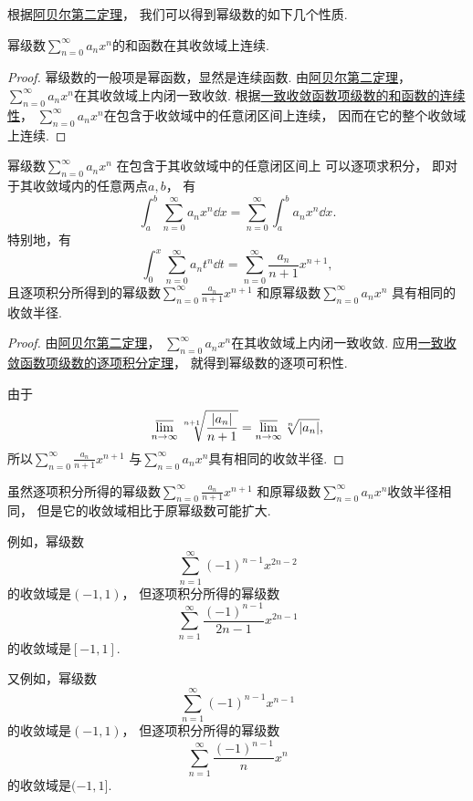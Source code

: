 根据\hyperref[theorem:无穷级数.阿贝尔定理2]{阿贝尔第二定理}，
我们可以得到幂级数的如下几个性质.

\begin{property}\label{theorem:无穷级数.幂级数的和函数的性质1}
幂级数\(\sum_{n=0}^\infty a_n x^n\)的和函数在其收敛域上连续.
\begin{proof}
幂级数的一般项是幂函数，显然是连续函数.
由\hyperref[theorem:无穷级数.阿贝尔定理2]{阿贝尔第二定理}，
\(\sum_{n=0}^\infty a_n x^n\)在其收敛域上内闭一致收敛.
根据\hyperref[theorem:函数项级数.连续函数项级数的内闭一致收敛性保证和函数的连续性]{一致收敛函数项级数的和函数的连续性}，
\(\sum_{n=0}^\infty a_n x^n\)在包含于收敛域中的任意闭区间上连续，
因而在它的整个收敛域上连续.
\end{proof}
\end{property}

\begin{property}\label{theorem:无穷级数.幂级数的和函数的性质2}
幂级数\(\sum_{n=0}^\infty a_n x^n\)
在包含于其收敛域中的任意闭区间上
可以逐项求积分，
即对于其收敛域内的任意两点\(a,b\)，
有\begin{equation}
	\int_a^b \sum_{n=0}^\infty a_n x^n \dd{x}
	= \sum_{n=0}^\infty \int_a^b a_n x^n \dd{x}.
\end{equation}
特别地，有\begin{equation}
	\int_0^x \sum_{n=0}^\infty a_n t^n \dd{t}
	= \sum_{n=0}^\infty \frac{a_n}{n+1} x^{n+1},
\end{equation}
且逐项积分所得到的幂级数\(\sum_{n=0}^\infty \frac{a_n}{n+1} x^{n+1}\)
和原幂级数\(\sum_{n=0}^\infty a_n x^n\)
具有相同的收敛半径.
\begin{proof}
由\hyperref[theorem:无穷级数.阿贝尔定理2]{阿贝尔第二定理}，
\(\sum_{n=0}^\infty a_n x^n\)在其收敛域上内闭一致收敛.
应用\hyperref[theorem:函数项级数.连续函数项级数的一致收敛性保证和函数的可积性]{一致收敛函数项级数的逐项积分定理}，
就得到幂级数的逐项可积性.

由于\[
	\varlimsup_{n\to\infty} \sqrt[n+1]{\frac{\abs{a_n}}{n+1}}
	= \varlimsup_{n\to\infty} \sqrt[n]{\abs{a_n}},
\]
所以\(\sum_{n=0}^\infty \frac{a_n}{n+1} x^{n+1}\)
与\(\sum_{n=0}^\infty a_n x^n\)具有相同的收敛半径.
\end{proof}
\end{property}
\begin{remark}
虽然逐项积分所得的幂级数\(\sum_{n=0}^\infty \frac{a_n}{n+1} x^{n+1}\)
和原幂级数\(\sum_{n=0}^\infty a_n x^n\)收敛半径相同，
但是它的收敛域相比于原幂级数可能扩大.

例如，幂级数\[
	\sum_{n=1}^\infty (-1)^{n-1} x^{2n-2}
\]的收敛域是\((-1,1)\)，
但逐项积分所得的幂级数\[
	\sum_{n=1}^\infty \frac{(-1)^{n-1}}{2n-1} x^{2n-1}
\]的收敛域是\([-1,1]\).

又例如，幂级数\[
	\sum_{n=1}^\infty (-1)^{n-1} x^{n-1}
\]的收敛域是\((-1,1)\)，
但逐项积分所得的幂级数\[
	\sum_{n=1}^\infty \frac{(-1)^{n-1}}{n} x^n
\]的收敛域是\((-1,1]\).
\end{remark}

